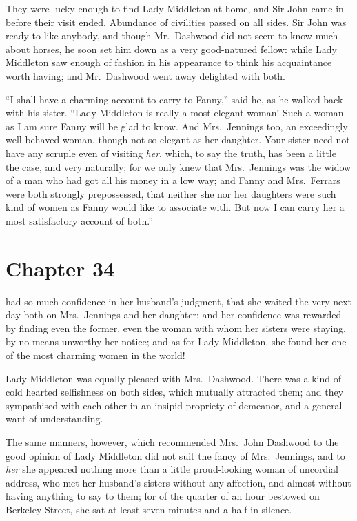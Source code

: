 They were lucky enough to find Lady Middleton
at home, and Sir John came in before their visit ended.
Abundance of civilities passed on all sides.  Sir John
was ready to like anybody, and though Mr.\ Dashwood did
not seem to know much about horses, he soon set him
down as a very good-natured fellow: while Lady Middleton
saw enough of fashion in his appearance to think his
acquaintance worth having; and Mr.\ Dashwood went away
delighted with both.

``I shall have a charming account to carry
to Fanny,'' said he, as he walked back with his sister.
``Lady Middleton is really a most elegant woman!  Such
a woman as I am sure Fanny will be glad to know.
And Mrs.\ Jennings too, an exceedingly well-behaved woman,
though not so elegant as her daughter.  Your sister need
not have any scruple even of visiting \emph{her}, which, to say
the truth, has been a little the case, and very naturally;
for we only knew that Mrs.\ Jennings was the widow of a man
who had got all his money in a low way; and Fanny and
Mrs.\ Ferrars were both strongly prepossessed, that neither
she nor her daughters were such kind of women as Fanny
would like to associate with.  But now I can carry her
a most satisfactory account of both.''



\chapter{Chapter 34}


 had so much confidence in her
husband's judgment, that she waited the very next day
both on Mrs.\ Jennings and her daughter; and her
confidence was rewarded by finding even the former,
even the woman with whom her sisters were staying,
by no means unworthy her notice; and as for Lady Middleton,
she found her one of the most charming women in the world!

Lady Middleton was equally pleased with Mrs.\ Dashwood.
There was a kind of cold hearted selfishness on both sides,
which mutually attracted them; and they sympathised
with each other in an insipid propriety of demeanor,
and a general want of understanding.

The same manners, however, which recommended Mrs.\ John
Dashwood to the good opinion of Lady Middleton did not suit
the fancy of Mrs.\ Jennings, and to \emph{her} she appeared nothing
more than a little proud-looking woman of uncordial address,
who met her husband's sisters without any affection,
and almost without having anything to say to them;
for of the quarter of an hour bestowed on Berkeley Street,
she sat at least seven minutes and a half in silence.

